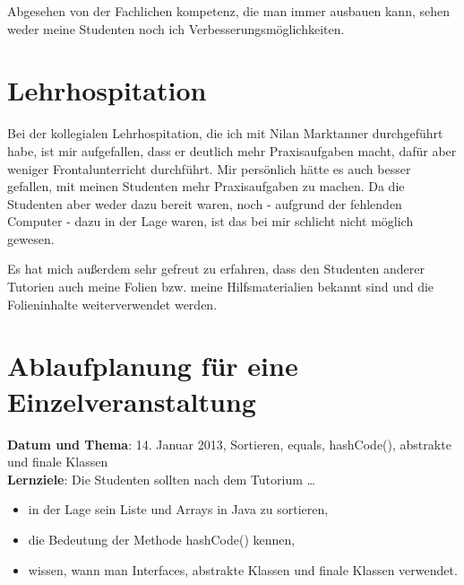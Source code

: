 \documentclass[a4paper,12pt]{article}
\begin{document}
Abgesehen von der Fachlichen kompetenz, die man immer ausbauen kann,
sehen weder meine Studenten noch ich Verbesserungsmöglichkeiten.

\section*{Lehrhospitation}
Bei der kollegialen Lehrhospitation, die ich mit Nilan Marktanner
durchgeführt habe, ist mir aufgefallen, dass er deutlich mehr
Praxisaufgaben macht, dafür aber weniger Frontalunterricht durchführt.
Mir persönlich hätte es auch besser gefallen, mit meinen Studenten
mehr Praxisaufgaben zu machen. Da die Studenten aber weder dazu
bereit waren, noch - aufgrund der fehlenden Computer - dazu in der
Lage waren, ist das bei mir schlicht nicht möglich gewesen.

Es hat mich außerdem sehr gefreut zu erfahren, dass den Studenten
anderer Tutorien auch meine Folien bzw. meine Hilfsmaterialien
bekannt sind und die Folieninhalte weiterverwendet werden.

\clearpage
\section*{Ablaufplanung für eine Einzelveranstaltung}
\textbf{Datum und Thema}: 14. Januar 2013, Sortieren, equals,
hashCode(), abstrakte und finale Klassen\\
\textbf{Lernziele}: Die Studenten sollten nach dem Tutorium \dots
\begin{itemize}
    \item in der Lage sein Liste und Arrays in Java zu sortieren,
    \item die Bedeutung der Methode hashCode() kennen,
    \item wissen, wann man Interfaces, abstrakte Klassen und finale
          Klassen verwendet.
\end{itemize}
\end{document}
